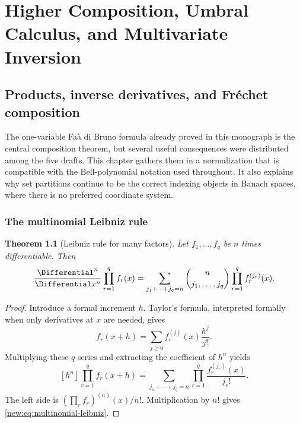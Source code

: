 \documentclass[11pt,a4paper,oneside,openany]{book}
\newtheorem{theorem}{Theorem}[chapter]
\theoremstyle{definition}
\theoremstyle{remark}
\begin{document}

\part{Higher Composition, Umbral Calculus, and Multivariate Inversion}

\chapter{Products, inverse derivatives, and Fr\'echet composition}
\label{ch:higher-composition}

The one-variable Fa\`a di Bruno formula already proved in this monograph is the
central composition theorem, but several useful consequences were distributed
among the five drafts.  This chapter gathers them in a normalization that is
compatible with the Bell-polynomial notation used throughout.  It also explains
why set partitions continue to be the correct indexing objects in Banach spaces,
where there is no preferred coordinate system.

\section{The multinomial Leibniz rule}

\begin{theorem}[Leibniz rule for many factors]
Let $f_1,\ldots,f_q$ be $n$ times differentiable.  Then
\begin{equation}
 \frac{\Differential^n}{\Differential x^n}\prod_{r=1}^q f_r(x)
 =\sum_{j_1+\cdots+j_q=n}
   \binom{n}{j_1,\ldots,j_q}
   \prod_{r=1}^q f_r^{(j_r)}(x).
 \label{new:eq:multinomial-leibniz}
\end{equation}
\end{theorem}

\begin{proof}
Introduce a formal increment $h$.  Taylor's formula, interpreted formally when
only derivatives at $x$ are needed, gives
\[
 f_r(x+h)=\sum_{j\ge0}f_r^{(j)}(x)\frac{h^j}{j!}.
\]
Multiplying these $q$ series and extracting the coefficient of $h^n$ yields
\[
 [h^n]\prod_{r=1}^q f_r(x+h)
 =\sum_{j_1+\cdots+j_q=n}
   \prod_{r=1}^q\frac{f_r^{(j_r)}(x)}{j_r!}.
\]
The left side is $(\prod_r f_r)^{(n)}(x)/n!$.  Multiplication by $n!$ gives
\eqref{new:eq:multinomial-leibniz}.
\end{proof}
\end{document}
